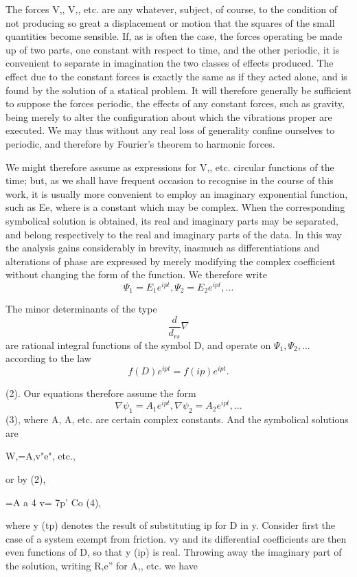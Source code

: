 The forces V,, V,, etc. are any whatever, subject, of course, to the condition
of not producing so great a displacement or motion that the squares of the
small quantities become sensible. If, as is often the case, the forces
operating be made up of two parts, one constant with respect to time, and the
other periodic, it is convenient to separate in imagination the two classes of
effects produced. The effect due to the constant forces is exactly the same as
if they acted alone, and is found by the solution of a statical problem. It
will therefore generally be sufficient to suppose the forces periodic, the
effects of any constant forces, such as gravity, being merely to alter the
configuration about which the vibrations proper are executed. We may thus
without any real loss of generality confine ourselves to periodic, and
therefore by Fourier's theorem to harmonic forces.

We might therefore assume as expressions for V,, etc. circular functions of the
time; but, as we shall have frequent occasion to recognise in the course of
this work, it is usually more convenient to employ an imaginary exponential
function, such as Ee, where is a constant which may be complex. When the
corresponding symbolical solution is obtained, its real and imaginary parts may
be separated, and belong respectively to the real and imaginary parts of the
data. In this way the analysis gains considerably in brevity, inasmuch as
differentiations and alterations of phase are expressed by merely modifying the
complex coefficient without changing the form of the function. We therefore
write
\[ \Psi_1 = E_1 e^{ipt}, \Psi_2 = E_2 e^{ipt}, \dots \]

The minor determinants of the type
\[ \frac{d}{d_{rs}} \nabla \]
are rational
integral functions of the symbol D, and operate on \( \Psi_1, \Psi_2, \dots \)
according to the law
\[f(D) e^{ipt} = f (ip) e^{ipt}.\]

(2). Our equations therefore assume the form
\[ \nabla \psi_1 = A_1 e^{ipt} , \nabla \psi_2 = A_2 e^{ipt} ,  \dots \]
(3), where A, A, etc. are certain
complex constants. And the symbolical solutions are

W,=A,v"e", etc.,

or by (2),

=A a 4 v= 7p' Co (4),

where y (tp) denotes the result of substituting ip for D in y. Consider first
the case of a system exempt from friction. vy and its differential coefficients
are then even functions of D, so that y (ip) is real.  Throwing away the
imaginary part of the solution, writing R,e'' for A,, etc. we have

